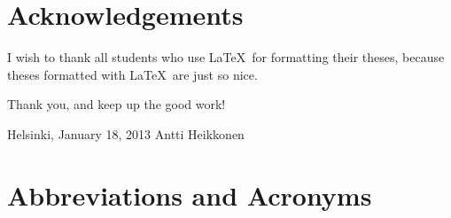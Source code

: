 \documentclass[12pt,a4paper,oneside,pdftex]{report}
\newcommand{\DATE}{January 18, 2013}
\newcommand{\AUTHOR}{Antti Heikkonen}
\begin{document}





\chapter*{Acknowledgements}

I wish to thank all students who use \LaTeX\ for formatting their theses,
because theses formatted with \LaTeX\ are just so nice.

Thank you, and keep up the good work!
\vskip 10mm

\noindent Helsinki, \DATE
\vskip 5mm
\noindent\AUTHOR

\cleardoublepage
% 

\chapter*{Abbreviations and Acronyms}

\end{document}
